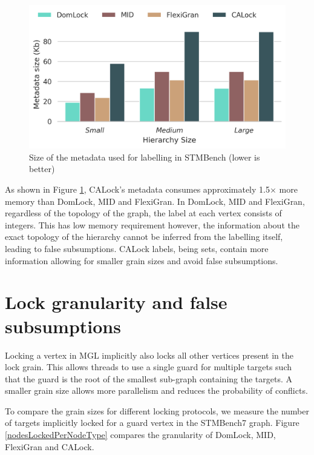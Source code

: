 \begin{figure}[h]
	\centering
	\captionsetup{justification=centering}
	\includegraphics[width=.7\columnwidth]{figures/PerformanceCharts/LabelsMemorySize.png}
 	\caption{Size of the metadata used for labelling in STMBench (lower is better)}
	\label{metadataSize}
\end{figure}

As shown in Figure \ref{metadataSize}, CALock's metadata consumes approximately 1.5$\times$ more memory than DomLock, MID and FlexiGran.
In DomLock, MID and FlexiGran, regardless of the topology of the graph, the label at each vertex consists of integers.
This has low memory requirement however, the information about the exact topology of the hierarchy cannot be inferred from the labelling itself, leading to false subsumptions.
CALock labels, being sets, contain more information allowing for smaller grain sizes and avoid false subsumptions.



\section{Lock granularity and false subsumptions}\label{benchmark:falseSubsumption}

Locking a vertex in MGL implicitly also locks all other vertices present in the lock grain. This allows threads to use a single guard for multiple targets such that the guard is the root of the smallest sub-graph containing the targets. A smaller grain size allows more parallelism and reduces the probability of conflicts. 

To compare the grain sizes for different locking protocols, we measure the number of targets implicitly locked for a guard vertex in the STMBench7 graph. 
Figure \ref{nodesLockedPerNodeType} compares the granularity of DomLock, MID, FlexiGran and CALock.

